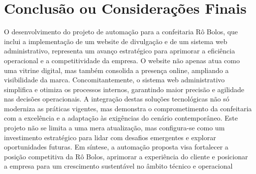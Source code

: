 \chapter{Conclusão ou Considerações Finais}

O desenvolvimento do projeto de automação para a confeitaria Rô Bolos,
que inclui a implementação de um website de divulgação e de um sistema web
administrativo, representa um avanço estratégico para aprimorar a eficiência
operacional e a competitividade da empresa. O website não apenas atua como
uma vitrine digital, mas também consolida a presença online, ampliando a
visibilidade da marca. Concomitantemente, o sistema web administrativo
simplifica e otimiza os processos internos, garantindo maior precisão e agilidade
nas decisões operacionais.
A integração destas soluções tecnológicas não só moderniza as práticas
vigentes, mas demonstra o comprometimento da confeitaria com a excelência e
a adaptação às exigências do cenário contemporâneo. Este projeto não se limita
a uma mera atualização, mas configura-se como um investimento estratégico
para lidar com desafios emergentes e explorar oportunidades futuras. Em
síntese, a automação proposta visa fortalecer a posição competitiva da Rô Bolos,
aprimorar a experiência do cliente e posicionar a empresa para um crescimento
sustentável no âmbito técnico e operacional